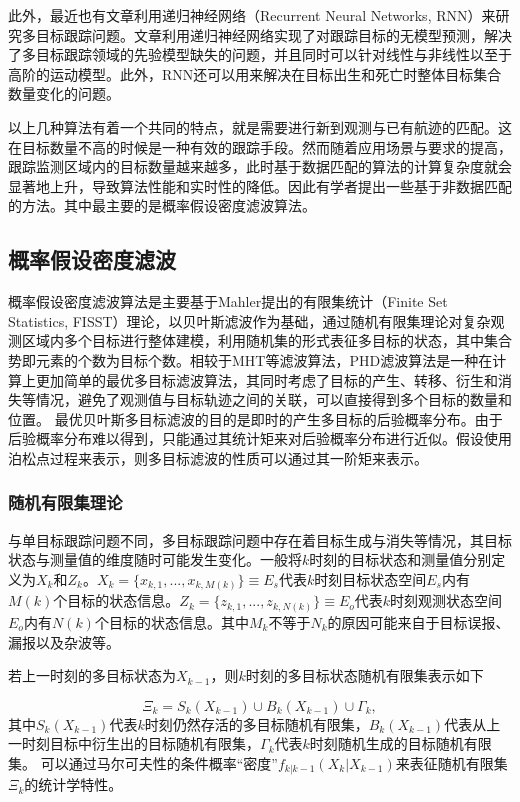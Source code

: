 此外，最近也有文章利用递归神经网络（Recurrent Neural Networks, RNN）来研究多目标跟踪问题\cite{milan2017online}。文章利用递归神经网络实现了对跟踪目标的无模型预测，解决了多目标跟踪领域的先验模型缺失的问题，并且同时可以针对线性与非线性以至于高阶的运动模型。此外，RNN还可以用来解决在目标出生和死亡时整体目标集合数量变化的问题。

以上几种算法有着一个共同的特点，就是需要进行新到观测与已有航迹的匹配。这在目标数量不高的时候是一种有效的跟踪手段。然而随着应用场景与要求的提高，跟踪监测区域内的目标数量越来越多，此时基于数据匹配的算法的计算复杂度就会显著地上升，导致算法性能和实时性的降低。因此有学者提出一些基于非数据匹配的方法。其中最主要的是概率假设密度滤波算法。


\subsection{概率假设密度滤波}

概率假设密度滤波算法是主要基于Mahler提出的有限集统计（Finite Set Statistics, FISST）理论\cite{mahler2007statistical}，以贝叶斯滤波作为基础，通过随机有限集理论对复杂观测区域内多个目标进行整体建模，利用随机集的形式表征多目标的状态，其中集合势即元素的个数为目标个数。相较于MHT等滤波算法，PHD滤波算法是一种在计算上更加简单的最优多目标滤波算法，其同时考虑了目标的产生、转移、衍生和消失等情况，避免了观测值与目标轨迹之间的关联，可以直接得到多个目标的数量和位置。 最优贝叶斯多目标滤波的目的是即时的产生多目标的后验概率分布。由于后验概率分布难以得到，只能通过其统计矩来对后验概率分布进行近似。假设使用泊松点过程来表示，则多目标滤波的性质可以通过其一阶矩来表示。

\subsubsection{随机有限集理论}

与单目标跟踪问题不同，多目标跟踪问题中存在着目标生成与消失等情况，其目标状态与测量值的维度随时可能发生变化。一般将$k$时刻的目标状态和测量值分别定义为$X_k$和$Z_k$。$X_k = \{x_{k,1},...,x_{k,M(k)}\} \equiv E_s$代表$k$时刻目标状态空间$E_s$内有$M(k)$个目标的状态信息。$Z_k = \{z_{k,1},...,z_{k,N(k)}\} \equiv E_o$代表$k$时刻观测状态空间$E_o$内有$N(k)$个目标的状态信息。其中$M_k$不等于$N_k$的原因可能来自于目标误报、漏报以及杂波等。

若上一时刻的多目标状态为$X_{k-1}$，则$k$时刻的多目标状态随机有限集\cite{mahler2007phd}表示如下

\begin{equation}
\Xi_k = S_k(X_{k-1})\cup B_k(X_{k-1}) \cup \Gamma_k,
\end{equation}
其中$S_k(X_{k-1})$代表$k$时刻仍然存活的多目标随机有限集，$B_k(X_{k-1})$代表从上一时刻目标中衍生出的目标随机有限集，$\Gamma_k$代表$k$时刻随机生成的目标随机有限集。
可以通过马尔可夫性的条件概率“密度”$f_{k|k-1}(X_k|X_{k-1})$来表征随机有限集$\Xi_k$的统计学特性。

